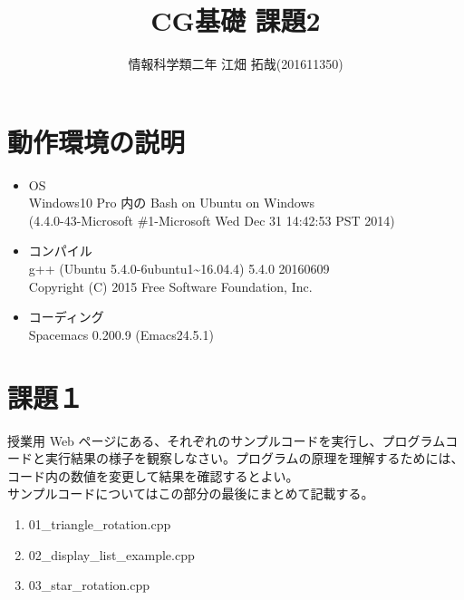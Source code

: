 \documentclass{scrartcl}
\author{情報科学類二年 江畑 拓哉(201611350)}
\date{}
\title{CG基礎 課題2}
\begin{document}
\maketitle

\section{動作環境の説明}
\label{sec:org17d60a6}
\begin{itemize}
\item OS\\
Windows10 Pro 内の Bash on Ubuntu on Windows\\
(4.4.0-43-Microsoft \#1-Microsoft Wed Dec 31 14:42:53 PST 2014)\\
\item コンパイル\\
g++ (Ubuntu 5.4.0-6ubuntu1\textasciitilde{}16.04.4) 5.4.0 20160609\\
Copyright (C) 2015 Free Software Foundation, Inc.\\
\item コーディング\\
Spacemacs 0.200.9 (Emacs24.5.1)\\
\end{itemize}

\section{課題１}
\label{sec:orgc3cb5a6}
授業用 Web ページにある、それぞれのサンプルコードを実行し、プログラムコードと実行結果の様子を観察しなさい。プログラムの原理を理解するためには、コード内の数値を変更して結果を確認するとよい。\\
サンプルコードについてはこの部分の最後にまとめて記載する。\\

\begin{enumerate}
\item 01\_triangle\_rotation.cpp\\

\item 02\_display\_list\_example.cpp\\

\item 03\_star\_rotation.cpp \\
\end{enumerate}
\end{document}
